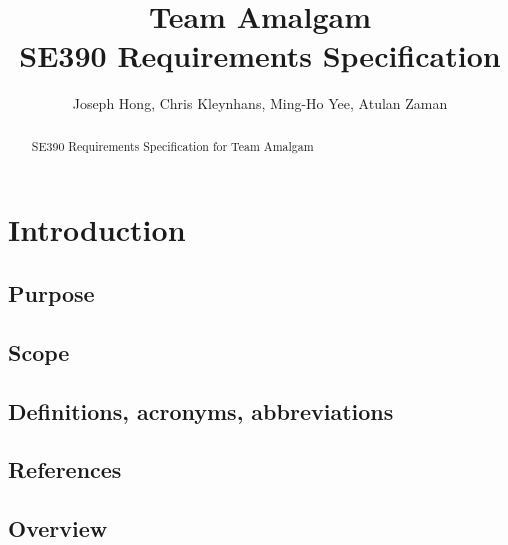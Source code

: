 \documentclass[11pt]{article}
\title{Team Amalgam \\ SE390 Requirements Specification}
\author{Joseph Hong, Chris Kleynhans, Ming-Ho Yee, Atulan Zaman}
\begin{document}
\maketitle

\begin{abstract}

SE390 Requirements Specification for Team Amalgam

\end{abstract}

\tableofcontents
\newpage

\section{Introduction} %
\subsection{Purpose}

\subsection{Scope}

\subsection{Definitions, acronyms, abbreviations}

\subsection{References}

\subsection{Overview}
\end{document}

